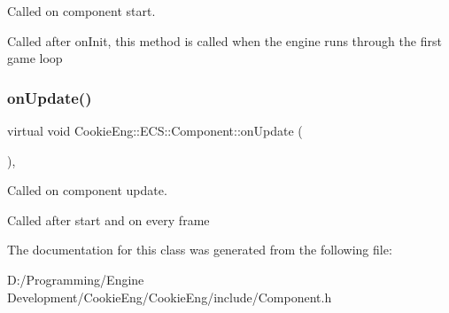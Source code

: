 Called on component start. 

Called after on\+Init, this method is called when the engine runs through the first game loop \mbox{\label{class_cookie_eng_1_1_e_c_s_1_1_component_a7c4a11f71e21181bc6f56841565b9a56}} 
\subsubsection{\texorpdfstring{on\+Update()}{onUpdate()}}
{\footnotesize\ttfamily virtual void Cookie\+Eng\+::\+E\+C\+S\+::\+Component\+::on\+Update (\begin{DoxyParamCaption}{ }\end{DoxyParamCaption})\hspace{0.3cm}{\ttfamily [inline]}, {\ttfamily [virtual]}}



Called on component update. 

Called after start and on every frame 

The documentation for this class was generated from the following file\+:\begin{DoxyCompactItemize}
\item 
D\+:/\+Programming/\+Engine Development/\+Cookie\+Eng/\+Cookie\+Eng/include/Component.\+h\end{DoxyCompactItemize}
